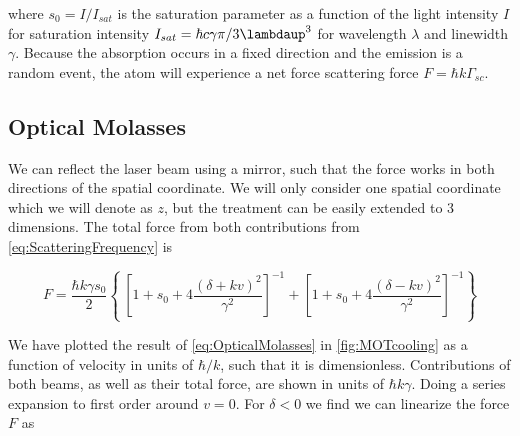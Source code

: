 where $s_0 = I/I_{sat}$ is the saturation parameter as a function of the light intensity $I$ for saturation intensity $I_{sat} = \hbar c \gamma \pi/3\lambdaup^3$ for wavelength $\lambda$ and linewidth $\gamma$. Because the absorption occurs in a fixed direction and the emission is a random event, the atom will experience a net force scattering force $F = \hbar k \Gamma_{sc}$.

\subsection{Optical Molasses}

We can reflect the laser beam using a mirror, such that the force works in both directions of the spatial coordinate. We will only consider one spatial coordinate which we will denote as $z$, but the treatment can be easily extended to 3 dimensions. The total force from both contributions from \cref{eq:ScatteringFrequency} is \cite{Kowalski2010}

\begin{equation}\label{eq:OpticalMolasses}
	F = \frac{\hbar k \gamma s_0}{2}\left\{\
	\left[1 + s_0 + 4\frac{(\delta+kv)^2}{\gamma^2}\right]^{-1}+
	\left[1 + s_0 + 4\frac{(\delta-kv)^2}{\gamma^2}\right]^{-1}
	\right\}
\end{equation}

We have plotted the result of \cref{eq:OpticalMolasses} in \cref{fig:MOTcooling} as a function of velocity in units of $\hbar / k$, such that it is dimensionless. Contributions of both beams, as well as their total force, are shown in units of $\hbar k \gamma$. Doing a series expansion to first order around $v = 0$. For $\delta<0$ we find we can linearize the force $F$ as \cite{Metcalf1999}

